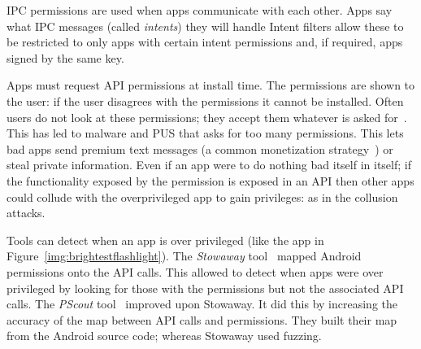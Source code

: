 \documentclass[a4paper]{article}
\begin{document}
IPC permissions are used when apps communicate with each other.  Apps say what
IPC messages (called \emph{intents}) they will handle  Intent filters allow
these to be restricted to only apps with certain intent permissions and, if
required, apps signed by the same key.

Apps must request API permissions at install time.  The permissions are shown to
the user: if the user disagrees with the permissions it cannot be installed.
Often users do not look at these permissions; they accept them whatever is asked
for~\cite{Felt:2012hm}.  This has led to malware and \ac{PUS} that asks for too
many permissions. This lets bad apps send premium text messages (a common
monetization strategy~\cite{Chien:2011vw}) or steal private information.  Even
if an app were to do nothing bad itself in itself; if the functionality exposed
by the permission is exposed in an API then other apps could collude with the
overprivileged app to gain privileges: as in the collusion attacks.

Tools can detect when an app is over privileged (like the app in
Figure~\ref{img:brightestflashlight}). The \emph{Stowaway}
tool~\cite{Felt:2011kj} mapped Android permissions onto the API calls. This
allowed \citeauthor*{Felt:2011kj} to detect when apps were over privileged by
looking for those with the permissions but not the associated API calls. The
\emph{PScout} tool~\cite{Au:2012ju} improved upon Stowaway.  It did this by
increasing the accuracy of the map between API calls and permissions. They built
their map from the Android source code; whereas Stowaway used fuzzing.
\end{document}
